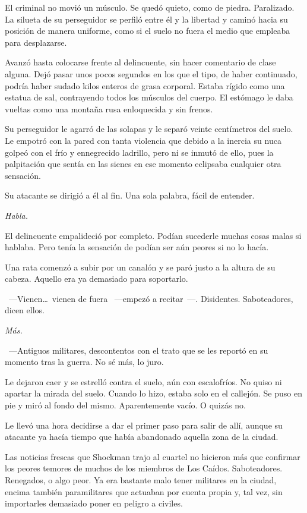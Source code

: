 El criminal no movió un músculo. Se quedó quieto, como de piedra. Paralizado. La silueta de su perseguidor se perfiló entre él y la libertad y caminó hacia su posición de manera uniforme, como si el suelo no fuera el medio que empleaba para desplazarse.

Avanzó hasta colocarse frente al delincuente, sin hacer comentario de clase alguna. Dejó pasar unos pocos segundos en los que el tipo, de haber continuado, podría haber sudado kilos enteros de grasa corporal. Estaba rígido como una estatua de sal, contrayendo todos los músculos del cuerpo. El estómago le daba vueltas como una montaña rusa enloquecida y sin frenos.

Su perseguidor le agarró de las solapas y le separó veinte centímetros del suelo. Le empotró con la pared con tanta violencia que debido a la inercia su nuca golpeó con el frío y ennegrecido ladrillo, pero ni se inmutó de ello, pues la palpitación que sentía en las sienes en ese momento eclipsaba cualquier otra sensación.

Su atacante se dirigió a él al fin. Una sola palabra, fácil de entender.

\emph{Habla.}

El delincuente empalideció por completo. Podían sucederle muchas cosas malas si hablaba. Pero tenía la sensación de podían ser aún peores si no lo hacía.

Una rata comenzó a subir por un canalón y se paró justo a la altura de su cabeza. Aquello era ya demasiado para soportarlo.

~---Vienen\dots\ vienen de fuera ~---empezó a recitar~---. Disidentes. Saboteadores, dicen ellos.

\emph{Más.}

~---Antiguos militares, descontentos con el trato que se les reportó en su momento tras la guerra. No sé más, lo juro.

Le dejaron caer y se estrelló contra el suelo, aún con escalofríos. No quiso ni apartar la mirada del suelo. Cuando lo hizo, estaba solo en el callejón. Se puso en pie y miró al fondo del mismo. Aparentemente vacío. O quizás no.

Le llevó una hora decidirse a dar el primer paso para salir de allí, aunque su atacante ya hacía tiempo que había abandonado aquella zona de la ciudad.

\parbreak
Las noticias frescas que Shockman trajo al cuartel no hicieron más que confirmar los peores temores de muchos de los miembros de Los Caídos. Saboteadores. Renegados, o algo peor. Ya era bastante malo tener militares en la ciudad, encima también paramilitares que actuaban por cuenta propia y, tal vez, sin importarles demasiado poner en peligro a civiles.

